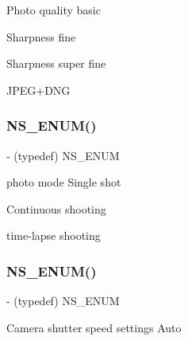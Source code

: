 Photo quality basic

Sharpness fine

Sharpness super fine

J\+P\+E\+G+\+D\+NG\mbox{\label{interface_p_v_eye_camera_settings_def_a5bfb9601dbbfc92413adbd1d89a71320}} 
\subsubsection{\texorpdfstring{N\+S\+\_\+\+E\+N\+U\+M()}{NS\_ENUM()}\hspace{0.1cm}{\footnotesize\ttfamily [10/17]}}
{\footnotesize\ttfamily -\/ (typedef) N\+S\+\_\+\+E\+N\+UM \begin{DoxyParamCaption}\item[{(N\+S\+U\+Integer)}]{ }\item[{(P\+V\+Eye\+Camera\+Mode)}]{ }\end{DoxyParamCaption}}

photo mode Single shot

Continuous shooting

time-\/lapse shooting\mbox{\label{interface_p_v_eye_camera_settings_def_a72af9f8c93ab40069cd9a63e753c57f9}} 
\subsubsection{\texorpdfstring{N\+S\+\_\+\+E\+N\+U\+M()}{NS\_ENUM()}\hspace{0.1cm}{\footnotesize\ttfamily [11/17]}}
{\footnotesize\ttfamily -\/ (typedef) N\+S\+\_\+\+E\+N\+UM \begin{DoxyParamCaption}\item[{(N\+S\+U\+Integer)}]{ }\item[{(P\+V\+Eye\+Camera\+Photo\+Shutter\+Speed)}]{ }\end{DoxyParamCaption}}

Camera shutter speed settings Auto

